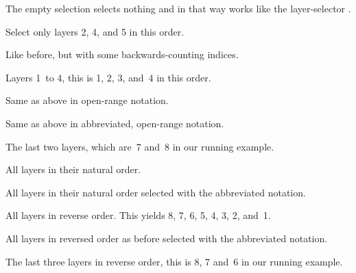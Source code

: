 \begin{codelist}
  \newcommand*{\lspec}[1]{\mbox{\val*{val:LAYERSPEC_OPEN}{#1}\val*{val:LAYERSPEC_CLOSE}}}%
\item[\lspec{}] The empty selection selects nothing and in that way
  works like the layer-selector .

\item[\lspec{2 :\ 4 :\ 5}] Select only layers 2, 4, and 5 in this order.

\item[\lspec{2 :\ -4 :\ -3}] Like before, but with some
  backwards-counting indices.

\item[\lspec{1 \val*{val:layer-range-separator}\ 4}] Layers 1~to 4,
  this is 1, 2, 3, and~4 in this order.

\item[\lspec{\val*{val:layer-range-empty-index-symbol}\
      \val*{val:layer-range-separator}\ 4}] Same as above in
  open-range notation.

\item[\lspec{\val*{val:layer-range-separator}\ 4}] Same as above in
  abbreviated, open-range notation.

\item[\lspec{-2 \val*{val:layer-range-separator}\
      \val*{val:layer-range-empty-index-symbol}}] The last two
  layers, which are~7 and~8 in our running example.

\item[\lspec{\val*{val:layer-range-empty-index-symbol}\
      \val*{val:layer-range-separator}\
      \val*{val:layer-range-empty-index-symbol}}] All layers in their
  natural order.

\item[\lspec{\val*{val:layer-range-separator}}] All layers in their
  natural order selected with the abbreviated notation.

\item[\lspec{reverse \val*{val:layer-range-empty-index-symbol}\
      \val*{val:layer-range-separator}\
      \val*{val:layer-range-empty-index-symbol}}] All layers in
  reverse order.  This yields 8, 7, 6, 5, 4, 3, 2, and~1.

\item[\lspec{rev \val*{val:layer-range-separator}}] All layers in
  reversed order as before selected with the abbreviated notation.

\item[\lspec{r -3 \val*{val:layer-range-separator}}] The last three
  layers in reverse order, this is 8, 7 and~6 in our running example.
\end{codelist}

